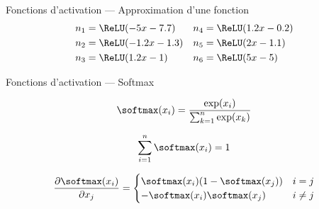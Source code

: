 \begin{frame}{Fonctions d'activation --- Approximation d'une fonction}
  \centering
  {\small
    \begin{align*}
      n_1 & = \ReLU(-5x - 7.7) & n_4 & = \ReLU(1.2x - 0.2) \\
      n_2 & = \ReLU(-1.2x - 1.3) & n_5 & = \ReLU(2x - 1.1) \\
      n_3 & = \ReLU(1.2x - 1) & n_6 & = \ReLU(5x - 5) \\
    \end{align*}
  }
\end{frame}

\begin{frame}{Fonctions d'activation --- Softmax}
  \begin{description}[<+->]
    \item[Définition] \[\softmax(x_i) = \frac{\exp(x_i)}{\sum_{k = 1}^n{\exp(x_k)}}\]
    \item[Propriété] \[\sum_{i = 1}^n{\softmax(x_i)} = 1\]
    \item[Gradient] \[
      \frac{\partial \softmax(x_i)}{\partial x_j} =
        \begin{cases}
          \softmax(x_i)(1 - \softmax(x_j)) & i = j \\
          -\softmax(x_i)\softmax(x_j) & i \neq j
        \end{cases}
      \]
  \end{description}
  
\end{frame}
